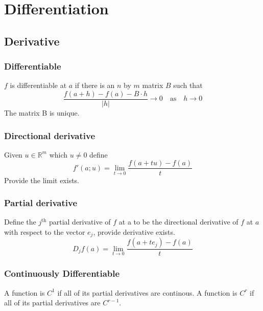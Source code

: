 \section{Differentiation}

\subsection{Derivative}
\label{derivative}

\subsubsection{Differentiable}
$f$ is differentiable at $a$ if there is an $n$ by $m$ matrix $B$ such that
			\[\frac{f(a+h)-f(a)-B\cdot h}{|h|}\to 0
			\quad\textrm{as}\quad h \to 0\]
		The matrix B is unique.

\subsubsection{Directional derivative}
Given $u\in \mathbb{R}^m$ which $u\neq 0$ define
		\[f'(a;u)=\lim_{t\to 0} \frac{f(a+tu)-f(a)}{t}\]
		Provide the limit exists.

\subsubsection{Partial derivative}
Define the $j^\textrm{th}$ partial derivative of $f$ at a
		to be the directional derivative of $f$ at $a$ with
		respect to the vector $e_j$, provide derivative exists.
		\[D_jf(a)=\lim_{t\to 0}\frac{f(a+te_j)-f(a)}{t}\]

\subsubsection{Continuously Differentiable}
A function is $C^1$ if all of its partial derivatives are continous. A function is $C^r$ if all of its partial derivatives are $C^{r-1}$.

